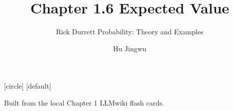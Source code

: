 [circle]
[default]

\usepackage{amsmath,amssymb,mathtools}

\newcommand{\R}{\mathbb{R}}
\newcommand{\N}{\mathbb{N}}
\newcommand{\Prob}{\mathbb{P}}
\newcommand{\E}{\mathbb{E}}
\newcommand{\var}{\operatorname{var}}
\newcommand{\one}{\mathbf{1}}
\newcommand{\eps}{\varepsilon}
\newcommand{\norm}[1]{\left\lVert #1\right\rVert}
\newcommand{\vikiname}[1]{\par\smallskip{\scriptsize\color{blue!60!black}\textbf{LLMwiki:} \texttt{\detokenize{#1}}}}
\newcommand{\blankproof}{%
  \vspace{2mm}
  {\color{gray!55}\rule{\linewidth}{0.4pt}}\par\vspace{5mm}
  {\color{gray!55}\rule{\linewidth}{0.4pt}}\par\vspace{5mm}
  {\color{gray!55}\rule{\linewidth}{0.4pt}}\par\vspace{5mm}
  {\color{gray!55}\rule{\linewidth}{0.4pt}}\par
}
\newcommand{\longblankproof}{%
  \vspace{1mm}
  {\color{gray!55}\rule{\linewidth}{0.4pt}}\par\vspace{4mm}
  {\color{gray!55}\rule{\linewidth}{0.4pt}}\par\vspace{4mm}
  {\color{gray!55}\rule{\linewidth}{0.4pt}}\par\vspace{4mm}
  {\color{gray!55}\rule{\linewidth}{0.4pt}}\par\vspace{4mm}
  {\color{gray!55}\rule{\linewidth}{0.4pt}}\par\vspace{4mm}
  {\color{gray!55}\rule{\linewidth}{0.4pt}}\par
}
\newcommand{\proofblock}[1]{\ifteacher #1 \else \blankproof \fi}
\newcommand{\longproofblock}[1]{\ifteacher #1 \else \longblankproof \fi}

\title[Chapter 1.6]{Chapter 1.6 Expected Value}
\subtitle{Rick Durrett Probability: Theory and Examples}
\author{Hu Jingwu}
\date{}



\begin{frame}
  \titlepage
  \vspace{-5mm}
  \begin{center}
    \small Built from the local Chapter 1 LLMwiki flash cards.
  \end{center}
\end{frame}

